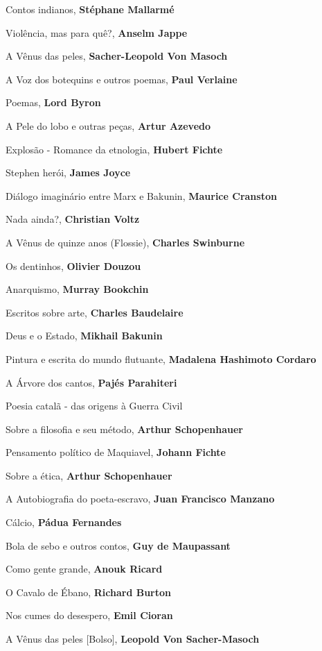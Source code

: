 \begin{multicols}{2}
\begin{enumerate}
{\item Contos indianos, \textbf{Stéphane Mallarmé}
\item Violência, mas para quê?, \textbf{Anselm Jappe}
\item A Vênus das peles, \textbf{Sacher-Leopold Von Masoch}
\item A Voz dos botequins e outros poemas, \textbf{Paul Verlaine}
\item Poemas, \textbf{Lord Byron}
\item A Pele do lobo e outras peças, \textbf{Artur Azevedo}
\item Explosão - Romance da etnologia, \textbf{Hubert Fichte}
\item Stephen herói, \textbf{James Joyce}
\item Diálogo imaginário entre Marx e Bakunin, \textbf{Maurice Cranston}
\item Nada ainda?, \textbf{Christian Voltz}
\item A Vênus de quinze anos (Flossie), \textbf{Charles Swinburne}
\item Os dentinhos, \textbf{Olivier Douzou}
\item Anarquismo, \textbf{Murray Bookchin}
\item Escritos sobre arte, \textbf{Charles Baudelaire}
\item Deus e o Estado, \textbf{Mikhail Bakunin}
\item Pintura e escrita do mundo flutuante, \textbf{Madalena Hashimoto Cordaro}
\item A Árvore dos cantos, \textbf{Pajés Parahiteri}
\item Poesia catalã - das origens à Guerra Civil
\item Sobre a filosofia e seu método, \textbf{Arthur Schopenhauer}
\item Pensamento político de Maquiavel, \textbf{Johann Fichte}
\item Sobre a ética, \textbf{Arthur Schopenhauer}
\item A Autobiografia do poeta-escravo, \textbf{Juan Francisco Manzano}
\item Cálcio, \textbf{Pádua Fernandes}
\item Bola de sebo e outros contos, \textbf{Guy de Maupassant}
\item Como gente grande, \textbf{Anouk Ricard}
\item O Cavalo de Ébano, \textbf{Richard Burton}
\item Nos cumes do desespero, \textbf{Emil Cioran}
\item A Vênus das peles [Bolso], \textbf{Leopold Von Sacher-Masoch}
}
\end{enumerate}
\end{multicols}
